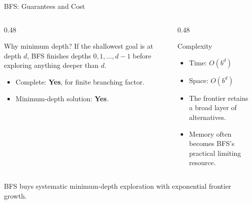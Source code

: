 \documentclass[aspectratio=169,10pt]{beamer}
\begin{document}
\begin{frame}[shrink=20]{BFS: Guarantees and Cost}
  \begin{columns}[T,onlytextwidth]
    \begin{column}{0.48\textwidth}
      \begin{block}{Why minimum depth?}
        If the shallowest goal is at depth $d$, BFS finishes depths $0,1,\ldots,d-1$ before exploring anything deeper than $d$.
      \end{block}

      \begin{itemize}
        \item Complete: \textbf{Yes}, for finite branching factor.
        \item Minimum-depth solution: \textbf{Yes}.
      \end{itemize}
    \end{column}

    \begin{column}{0.48\textwidth}
      \begin{block}{Complexity}
        \begin{itemize}
          \item Time: $O(b^d)$
          \item Space: $O(b^d)$
        \end{itemize}
      \end{block}

      \begin{itemize}
        \item The frontier retains a broad layer of alternatives.
        \item Memory often becomes BFS's practical limiting resource.
      \end{itemize}
    \end{column}
  \end{columns}

  \begin{keyidea}
    BFS buys systematic minimum-depth exploration with exponential frontier growth.
  \end{keyidea}
\end{frame}

\end{document}

